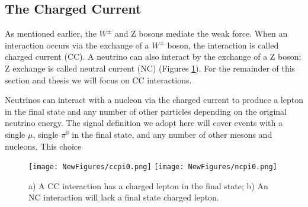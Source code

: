 \documentclass[12pt]{article}
\begin{document}
\subsection{The Charged Current}
As mentioned earlier, the $W^\pm$ and Z bosons mediate the weak force. When an interaction occurs via the exchange of a $W^\pm$ boson, the interaction is called charged current (CC).  A neutrino can also interact by the exchange of a Z boson; Z exchange is called neutral current (NC) (Figures \ref{fig:CCNC}). For the remainder of this section and thesis we will focus on CC interactions. 

Neutrinos can interact with a nucleon via the charged current to produce a lepton in the final state and any number of other particles depending on the original neutrino energy. The signal definition we adopt here will cover events with a single $\mu$, single $\pi^0$ in the final state, and any number of other mesons and nucleons. This choice

\begin{figure}[H]
\centering
\texttt{[image: NewFigures/ccpi0.png]}
\hspace{3 mm}
\texttt{[image: NewFigures/ncpi0.png]}
\caption{a) A CC interaction has a charged lepton in the final state; b) An NC interaction will lack a final state charged lepton.} 
\label{fig:CCNC}
\end{figure}
\end{document}
